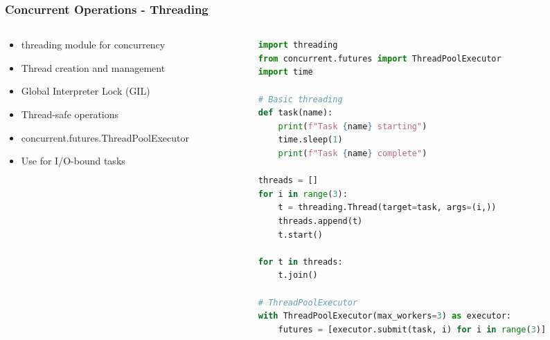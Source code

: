 \begin{frame}[fragile]\frametitle{Concurrent Operations - Threading}
\begin{columns}
    \begin{column}[T]{0.5\linewidth}
      \begin{itemize}
        \item threading module for concurrency
        \item Thread creation and management
        \item Global Interpreter Lock (GIL)
        \item Thread-safe operations
        \item concurrent.futures.ThreadPoolExecutor
        \item Use for I/O-bound tasks
      \end{itemize}
    \end{column}
    \begin{column}[T]{0.5\linewidth}
      \begin{lstlisting}[language=python, basicstyle=\tiny]
import threading
from concurrent.futures import ThreadPoolExecutor
import time

# Basic threading
def task(name):
    print(f"Task {name} starting")
    time.sleep(1)
    print(f"Task {name} complete")

threads = []
for i in range(3):
    t = threading.Thread(target=task, args=(i,))
    threads.append(t)
    t.start()

for t in threads:
    t.join()

# ThreadPoolExecutor
with ThreadPoolExecutor(max_workers=3) as executor:
    futures = [executor.submit(task, i) for i in range(3)]
      \end{lstlisting}
    \end{column}
  \end{columns}
\end{frame}

